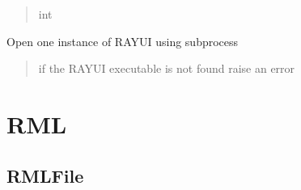 \documentclass[letterpaper,10pt,english]{sphinxmanual}
\begin{document}
\begin{fulllineitems}
\begin{fulllineitems}
\begin{quote}
\begin{description}
\sphinxAtStartPar
int

\end{description}\end{quote}

\end{fulllineitems}


\begin{fulllineitems}
\label{\detokenize{code_documentation:raypyng.runner.RayUIRunner.run}}
\pysigstartsignatures
{}
\pysigstopsignatures
\sphinxAtStartPar
Open one instance of RAY\sphinxhyphen{}UI using subprocess
\begin{quote}\begin{description}
\sphinxAtStartPar
{} \textendash{} if the RAY\sphinxhyphen{}UI executable is not found raise an error

\end{description}\end{quote}

\end{fulllineitems}


\end{fulllineitems}



\section{RML}
\label{\detokenize{code_documentation:rml}}

\subsection{RMLFile}
\label{\detokenize{code_documentation:rmlfile}}
\end{document}
